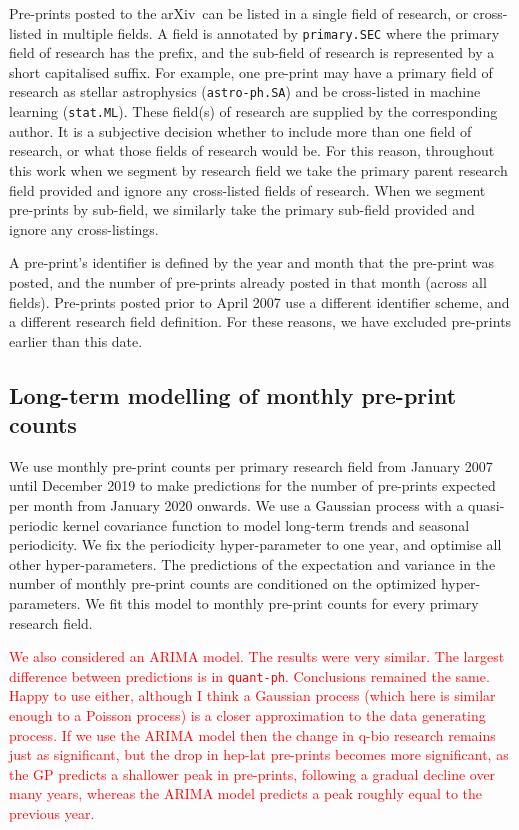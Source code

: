 \documentclass[a4paper,12pt]{article}
\newcommand{\todo}[1]{\textcolor{red}{#1}}
\newcommand{\arxiv}{arXiv}
\begin{document}
Pre-prints posted to the \arxiv\ can be listed in a single field of research, or cross-listed in multiple fields. A field is annotated by \texttt{primary.SEC} where the primary field of research has the prefix, and the sub-field of research is represented by a short capitalised suffix. For example, one pre-print may have a primary field of research as stellar astrophysics (\texttt{astro-ph.SA}) and be cross-listed in machine learning (\texttt{stat.ML}). These field(s) of research are supplied by the corresponding author. It is a subjective decision whether to include more than one field of research, or what those fields of research would be. For this reason, throughout this work when we segment by research field we take the primary parent research field provided and ignore any cross-listed fields of research. When we segment pre-prints by sub-field, we similarly take the primary sub-field provided and ignore any cross-listings.

A pre-print's identifier is defined by the year and month that the pre-print was posted, and the number of pre-prints already posted in that month (across all fields). Pre-prints posted prior to April 2007 use a different identifier scheme, and a different research field definition. For these reasons, we have excluded pre-prints earlier than this date. 


\subsection*{Long-term modelling of monthly pre-print counts}

We use monthly pre-print counts per primary research field from January 2007 until December 2019 to make predictions for the number of pre-prints expected per month from January 2020 onwards. We use a Gaussian process with a quasi-periodic kernel covariance function to model long-term trends and seasonal periodicity\cite{Rasmussen:2006,Ambikasaran:2014}. We fix the periodicity hyper-parameter to one year, and optimise all other hyper-parameters. The predictions of the expectation and variance in the number of monthly pre-print counts are conditioned on the optimized hyper-parameters. We fit this model to monthly pre-print counts for every primary research field.

\todo{We also considered an ARIMA model. The results were very similar. The largest difference between predictions is in \texttt{quant-ph}. Conclusions remained the same. Happy to use either, although I think a Gaussian process (which here is similar enough to a Poisson process) is a closer approximation to the data generating process. If we use the ARIMA model then the change in q-bio research remains just as significant, but the drop in hep-lat pre-prints becomes more significant, as the GP predicts a shallower peak in pre-prints, following a gradual decline over many years, whereas the ARIMA model predicts a peak roughly equal to the previous year.}
\end{document}
